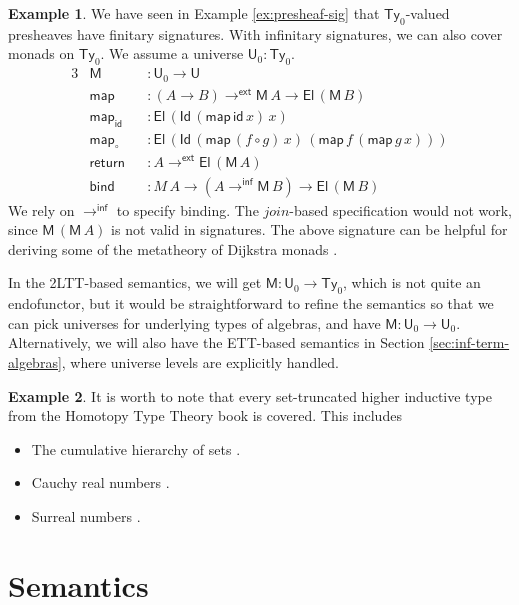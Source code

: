 \documentclass[12pt,a4paper,twoside,openany]{book}
\theoremstyle{remark}
\theoremstyle{definition}
\newtheorem{myexample}{Example}
\theoremstyle{theorem}
\newcommand{\mi}[1]{\mathit{#1}}
\newcommand{\ms}[1]{\mathsf{#1}}
\newcommand{\id}{\mathsf{id}}
\newcommand{\Ty}{\mathsf{Ty}}
\newcommand{\U}{\mathsf{U}}
\newcommand{\El}{\mathsf{El}}
\newcommand{\Id}{\mathsf{Id}}
\newcommand{\toe}{\to^{\ms{ext}}}
\newcommand{\toinf}{\to^{\ms{inf}}}
\begin{document}
\begin{myexample}
We have seen in Example \ref{ex:presheaf-sig} that $\Ty_0$-valued presheaves have finitary signatures.
With infinitary signatures, we can also cover monads on $\Ty_0$. We assume a
universe $\U_0 : \Ty_0$.
\begin{alignat*}{3}
  &\ms{M}              &&: \U_0 \to \U\\
  &\ms{map}       &&: (A \to B) \toe \ms{M}\,A \to \El\,(\ms{M}\,B)\\
  &\ms{map_{id}}   &&: \El\,(\Id\,(\ms{map}\,\id\,x)\,x)\\
  &\ms{map_{\circ}} &&: \El\,(\Id\,(\ms{map}\,(f \circ g)\,x)\,(\ms{map}\,f\,(\ms{map}\,g\,x)))\\
  &\ms{return}    &&: A \toe \El\,(\ms{M}\,A)\\
  &\ms{bind}      &&: M\,A \to (A \toinf \ms{M}\,B) \to \El\,(\ms{M}\,B)
\end{alignat*}
We rely on $\toinf$ to specify binding. The $\mi{join}$-based specification
would not work, since $\ms{M}\,(\ms{M}\,A)$ is not valid in signatures. The above
signature can be helpful for deriving some of the metatheory of Dijkstra monads
\cite[Section~5]{dijkstramonad}.

In the 2LTT-based semantics, we will get $\ms{M} : \U_0 \to \Ty_0$, which is not
quite an endofunctor, but it would be straightforward to refine the semantics so
that we can pick universes for underlying types of algebras, and have $\ms{M} :
\U_0 \to \U_0$. Alternatively, we will also have the ETT-based semantics in
Section \ref{sec:inf-term-algebras}, where universe levels are explicitly
handled.
\end{myexample}

\begin{myexample}
It is worth to note that every set-truncated higher inductive type from the
Homotopy Type Theory book \cite{hottbook} is covered. This includes
\begin{itemize}
\item The cumulative hierarchy of sets \cite[Section~10.5]{hottbook}.
\item Cauchy real numbers \cite[Section~11.3]{hottbook}.
\item Surreal numbers \cite[Section~11.6]{hottbook}.
\end{itemize}
\end{myexample}

\section{Semantics}
\end{document}
